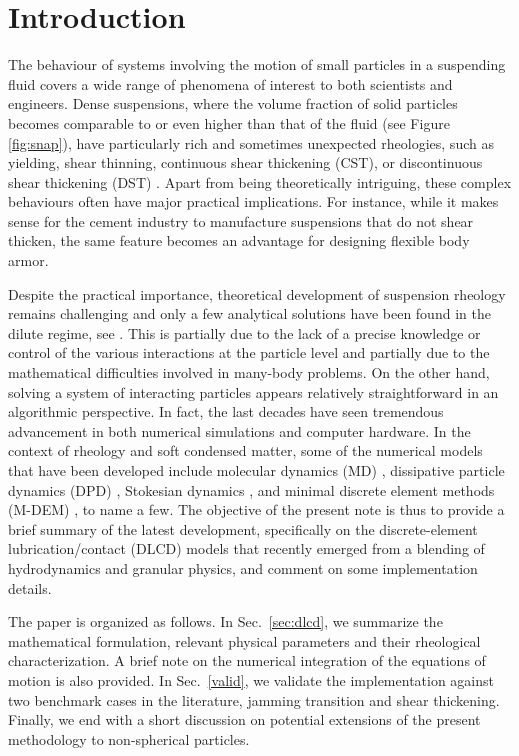 
\section{Introduction}

The behaviour of systems involving the motion of small particles in a suspending fluid covers a wide range of phenomena of interest to both scientists and engineers. Dense suspensions, where the volume fraction of solid particles becomes comparable to or even higher than that of the fluid (see Figure \ref{fig:snap}), have particularly rich and sometimes unexpected rheologies, such as yielding, shear thinning, continuous shear thickening (CST), or discontinuous shear thickening (DST) \citep{mewis_wagner_book, Morton_Morris_2014, guazzelli_pouliquen_2018, Morris_annurev2020}. Apart from being theoretically intriguing, these complex behaviours often have major practical implications. For instance, while it makes sense for the cement industry to manufacture suspensions that do not shear thicken, the same feature becomes an advantage for designing flexible body armor.

Despite the practical importance, theoretical development of suspension rheology remains challenging and only a few analytical solutions have been found in the dilute regime, see \eg \cite{Einstein_1906, batchelor_green_1972b}. This is partially due to the lack of a precise knowledge or control of the various interactions at the particle level and partially due to the mathematical difficulties involved in many-body problems. On the other hand, solving a system of interacting particles appears relatively straightforward in an algorithmic perspective. In fact, the last decades have seen tremendous advancement in both numerical simulations and computer hardware. In the context of rheology and soft condensed matter, some of the numerical models that have been developed include molecular dynamics (MD) \citep{Alder_Wainwright_1959,Verlet1967}, dissipative particle dynamics (DPD) \citep{Hoogerbrugge_1992, Groot_Warren_1997}, Stokesian dynamics \citep{Brady_Bossis1988}, and minimal discrete element methods (M-DEM) \citep{Mari_Seto_2014JoR, Cheal_Ness_2018}, to name a few. The objective of the present note is thus to provide a brief summary of the latest development, specifically on the discrete-element lubrication/contact (DLCD) models that recently emerged from a blending of hydrodynamics and granular physics, and comment on some implementation details.

The paper is organized as follows. In Sec.\ \ref{sec:dlcd}, we summarize the mathematical formulation, relevant physical parameters and their rheological characterization. A brief note on the numerical integration of the equations of motion is also provided. In Sec.\ \ref{valid}, we validate the implementation against two benchmark cases in the literature, \ie jamming transition and shear thickening. Finally, we end with a short discussion on potential extensions of the present methodology to non-spherical particles.



